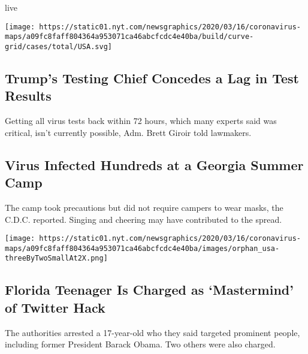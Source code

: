 live

\texttt{[image: https://static01.nyt.com/newsgraphics/2020/03/16/coronavirus-maps/a09fc8faff804364a953071ca46abcfcdc4e40ba/build/curve-grid/cases/total/USA.svg]}

\href{/2020/07/31/us/politics/trump-coronavirus-testing.html}{}

\hypertarget{trumps-testing-chief-concedes-a-lag-in-test-results}{%
\subsection{Trump's Testing Chief Concedes a Lag in Test
Results}\label{trumps-testing-chief-concedes-a-lag-in-test-results}}

Getting all virus tests back within 72 hours, which many experts said
was critical, isn't currently possible, Adm. Brett Giroir told
lawmakers.

\href{/2020/07/31/health/coronavirus-children-camp.html}{}

\hypertarget{virus-infected-hundreds-at-a-georgia-summer-camp}{%
\subsection{Virus Infected Hundreds at a Georgia Summer
Camp}\label{virus-infected-hundreds-at-a-georgia-summer-camp}}

The camp took precautions but did not require campers to wear masks, the
C.D.C. reported. Singing and cheering may have contributed to the
spread.

\texttt{[image: https://static01.nyt.com/newsgraphics/2020/03/16/coronavirus-maps/a09fc8faff804364a953071ca46abcfcdc4e40ba/images/orphan\_usa-threeByTwoSmallAt2X.png]}

\href{/2020/07/31/technology/twitter-hack-arrest.html}{}

\hypertarget{florida-teenager-is-charged-as-mastermind-of-twitter-hack}{%
\subsection{Florida Teenager Is Charged as `Mastermind' of Twitter
Hack}\label{florida-teenager-is-charged-as-mastermind-of-twitter-hack}}

The authorities arrested a 17-year-old who they said targeted prominent
people, including former President Barack Obama. Two others were also
charged.

\href{/2020/07/31/technology/tiktok-microsoft.html}{}

